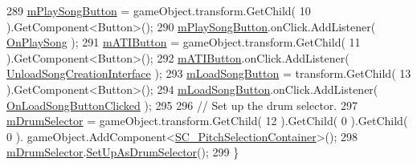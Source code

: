 \begin{DoxyCode}
289         \hyperlink{group___s_c_m_priv_var_ga4ba18826907a0efbeb2ad62444124657}{mPlaySongButton} = gameObject.transform.GetChild( 10 ).GetComponent<Button>();
290         \hyperlink{group___s_c_m_priv_var_ga4ba18826907a0efbeb2ad62444124657}{mPlaySongButton}.onClick.AddListener( \hyperlink{group___s_c_m_handlers_gafb394a0b00c8f9c0959d901faf9131c7}{OnPlaySong} );
291         \hyperlink{group___s_c_m_priv_var_gae702ec5de2c75149b8c650db9ac260a6}{mATIButton} = gameObject.transform.GetChild( 11 ).GetComponent<Button>();
292         \hyperlink{group___s_c_m_priv_var_gae702ec5de2c75149b8c650db9ac260a6}{mATIButton}.onClick.AddListener( \hyperlink{group___s_c_m_handlers_gac39b0d849c680dda1e047c3e7d848b51}{UnloadSongCreationInterface} );
293         \hyperlink{group___s_c_m_priv_var_ga7851ecd194d87e14fa186fc76e154222}{mLoadSongButton} = transform.GetChild( 13 ).GetComponent<Button>();
294         \hyperlink{group___s_c_m_priv_var_ga7851ecd194d87e14fa186fc76e154222}{mLoadSongButton}.onClick.AddListener( 
      \hyperlink{group___s_c_m_handlers_ga1747d021ddb36a8c2c172315d6fbb3a8}{OnLoadSongButtonClicked} );
295 
296         \textcolor{comment}{// Set up the drum selector.}
297         \hyperlink{group___s_c_m_priv_var_gac8be873b8259a0ddf76b4fa6d7d2d072}{mDrumSelector} = gameObject.transform.GetChild( 12 ).GetChild( 0 ).GetChild( 0 ).
      gameObject.AddComponent<\hyperlink{class_s_c___pitch_selection_container}{SC\_PitchSelectionContainer}>();
298         \hyperlink{group___s_c_m_priv_var_gac8be873b8259a0ddf76b4fa6d7d2d072}{mDrumSelector}.\hyperlink{group___s_c___p_s_c_pub_func_ga08a0a4943359eb7f28c64aaf4cbc233c}{SetUpAsDrumSelector}();
299     \}
\end{DoxyCode}
